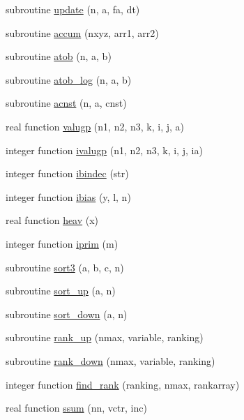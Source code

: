 \begin{DoxyCompactItemize}
\item 
subroutine \hyperlink{numutils_8f90_a200359bd573fec3331435894f648e8ee}{update} (n, a, fa, dt)
\item 
subroutine \hyperlink{numutils_8f90_a9f2eb3b2d4e125a6001ecccebc277b21}{accum} (nxyz, arr1, arr2)
\item 
subroutine \hyperlink{numutils_8f90_ad99541497f02a7efb987c5b45e675857}{atob} (n, a, b)
\item 
subroutine \hyperlink{numutils_8f90_ae5a54551de1362c5c8f48b41256620dd}{atob\+\_\+log} (n, a, b)
\item 
subroutine \hyperlink{numutils_8f90_ab544b9d2ffacb535b2b8c0baf3310679}{acnst} (n, a, cnst)
\item 
real function \hyperlink{numutils_8f90_a9cfbe8e8bd09da9d01ac89f72248d31b}{valugp} (n1, n2, n3, k, i, j, a)
\item 
integer function \hyperlink{numutils_8f90_a738cfc3429c69e172b59cecaa2c2cec4}{ivalugp} (n1, n2, n3, k, i, j, ia)
\item 
integer function \hyperlink{numutils_8f90_a4e632d5a011638df4e41d55d313dc8d0}{ibindec} (str)
\item 
integer function \hyperlink{numutils_8f90_af9cce0c15b88926c5fcf1c9212ed7a58}{ibias} (y, l, n)
\item 
real function \hyperlink{numutils_8f90_ac178ca276061d03a1aeacf3cc04f3e39}{heav} (x)
\item 
integer function \hyperlink{numutils_8f90_a25478eb8bc6927ae29dbc3d3369746e6}{iprim} (m)
\item 
subroutine \hyperlink{numutils_8f90_a9b0b08786a05782639965e2d9e9bc661}{sort3} (a, b, c, n)
\item 
subroutine \hyperlink{numutils_8f90_a0ce70697995bdbb28ca0f7de92ba5210}{sort\+\_\+up} (a, n)
\item 
subroutine \hyperlink{numutils_8f90_a5b33967115f0c167703ae10299a79774}{sort\+\_\+down} (a, n)
\item 
subroutine \hyperlink{numutils_8f90_a0084ebfe86806971df228c1a4ef3ffbf}{rank\+\_\+up} (nmax, variable, ranking)
\item 
subroutine \hyperlink{numutils_8f90_ad368a70da00278adffefa8d34a5f87c6}{rank\+\_\+down} (nmax, variable, ranking)
\item 
integer function \hyperlink{numutils_8f90_a732ad4008d82d16d53c093bf1cecccc3}{find\+\_\+rank} (ranking, nmax, rankarray)
\item 
real function \hyperlink{numutils_8f90_ae2669a094a5411c8d0b398ca7e71bd6f}{ssum} (nn, vctr, inc)

\end{DoxyCompactItemize}
